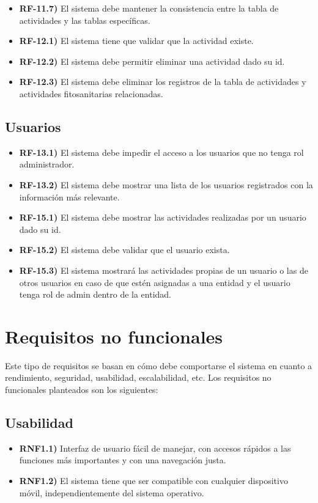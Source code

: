 \begin{itemize}
    \item \textbf{RF-11.7)} El sistema debe mantener la consistencia entre la tabla de actividades y las tablas específicas.
    \item \textbf{RF-12.1)} El sistema tiene que validar que la actividad existe.
    \item \textbf{RF-12.2)} El sistema debe permitir eliminar una actividad dado su id.
    \item \textbf{RF-12.3)} El sistema debe eliminar los registros de la tabla de actividades y actividades fitosanitarias relacionadas.
\end{itemize}

\subsection{Usuarios}

\begin{itemize}
    \item \textbf{RF-13.1)} El sistema debe impedir el acceso a los usuarios que no tenga rol administrador.
    \item \textbf{RF-13.2)} El sistema debe mostrar una lista de los usuarios registrados con la información más relevante.
    \item \textbf{RF-15.1)} El sistema debe mostrar las actividades realizadas por un usuario dado su id.
    \item \textbf{RF-15.2)} El sistema debe validar que el usuario exista.
    \item \textbf{RF-15.3)} El sistema mostrará las actividades propias de un usuario o las de otros usuarios en caso de 
    que estén asignadas a una entidad y el usuario tenga rol de admin dentro de la entidad.
\end{itemize}

\section{Requisitos no funcionales}

Este tipo de requisitos se basan en cómo debe comportarse el sistema en cuanto a rendimiento, seguridad, usabilidad, 
escalabilidad, etc. Los requisitos no funcionales planteados son los siguientes:

\subsection{Usabilidad}

\begin{itemize}
    \item \textbf{RNF1.1)} Interfaz de usuario fácil de manejar, con accesos rápidos a las funciones más importantes y con 
    una navegación justa.
    \item \textbf{RNF1.2)} El sistema tiene que ser compatible con cualquier dispositivo móvil, independientemente del 
    sistema operativo.
\end{itemize}

